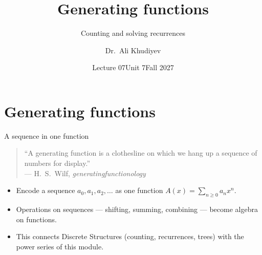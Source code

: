\documentclass[10pt]{wosm-slides}
\title[L07 \textperiodcentered\ Generating functions]{Generating functions}
\subtitle{Counting and solving recurrences}
\author{Dr.\ Ali Khudiyev}
\institute{WoSM Academy}
\date{Lecture 07\enspace\textperiodcentered\enspace Unit 7\enspace\textperiodcentered\enspace Fall 2027}
\begin{document}
\maketitle



\section{Generating functions}

\begin{frame}{A sequence in one function}
  \begin{quote}
    ``A generating function is a clothesline on which we hang up a sequence of numbers
    for display.'' \\ \hfill {\small\color{wosm-muted} --- H.~S.~Wilf, \emph{generatingfunctionology}}
  \end{quote}
  \pause
  \begin{itemize}
    \item Encode a sequence $a_0, a_1, a_2, \dots$ as one function
      $A(x) = \sum_{n \ge 0} a_n x^n$.
    \item Operations on sequences --- shifting, summing, combining --- become algebra on
      functions.
    \item This connects Discrete Structures (counting, recurrences, trees) with the power
      series of this module.
  \end{itemize}
\end{frame}
\end{document}
